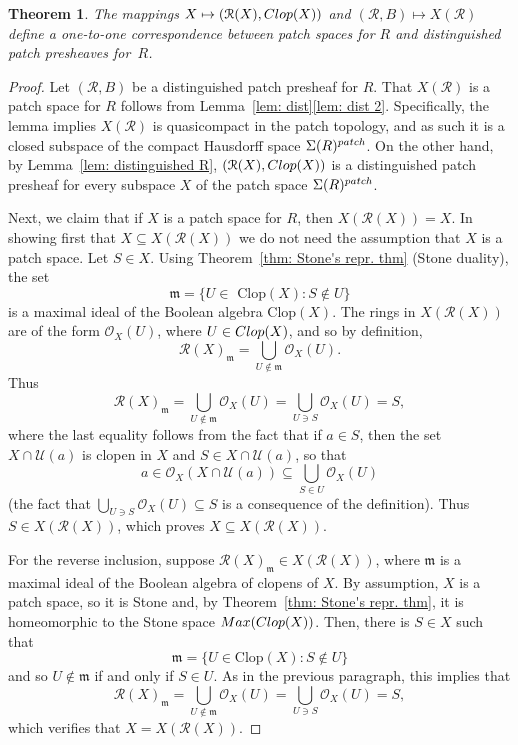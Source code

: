\documentclass[11pt]{amsart}
\def\m{{\mathfrak m}} %
\def\O{{\mathcal{O}}}
\newtheorem{theorem}{Theorem}[section]
\theoremstyle{definition}
\def\cal{\mathcal}
\begin{document}
\begin{theorem}\label{thm: one-to-one dist patch} 
The mappings $X \mapsto ({\cal R}(X), {\rm Clop}(X))$ and $({\cal R}, B)\mapsto X(\cal R)$ define a one-to-one correspondence between patch spaces for $R$ and distinguished patch presheaves for~$R$.  
\end{theorem} 

\begin{proof}  Let $({\cal R},B)$ be a distinguished patch presheaf for $R$. That $X({\cal R})$ is a patch space for $R$ follows from Lemma~\ref{lem: dist}\ref{lem: dist 2}. Specifically, the lemma implies  $X({\cal R})$ is quasicompact in the patch topology, and as such it is a closed subspace of the compact Hausdorff space $\Sigma(R)^{\rm patch}$. On the other hand, by Lemma~\ref{lem: distinguished R}, $({\cal R}(X),{\rm Clop}(X))$ is a distinguished patch presheaf for every subspace $X$ of the patch space $\Sigma(R)^{\rm patch}$. 

Next, we claim that if $X$ is a patch space for $R$, then $X({\mathcal R}(X)) = X$. 
In showing first that $X \subseteq X({\mathcal R}(X))$ we do not need the assumption that $X$ is a patch space. 
Let $S \in X$. Using Theorem~\ref{thm: Stone's repr. thm} (Stone duality), the set $$\m = \{U \in {\mbox{ Clop}}(X):S \not \in U\}$$ is a maximal ideal of the Boolean algebra Clop$(X)$.
The rings in $X({\cal R}(X))$ are of the form $\O_X(U)$, where $U \in {\rm Clop}(X)$, and so by definition, 
$${\cal R}(X)_{\m} = \bigcup_{U \not \in  \m}\O_X(U).$$ 
Thus %
$$ {\cal R}(X)_{\m} = \bigcup_{U \not \in \m}\O_X(U) = \bigcup_{U\ni S}\O_X(U) =S,$$ where the last equality follows from the fact that if $a \in S$, then the set $X \cap {\cal U}(a)$ is clopen in $X$  and $S \in X \cap {\cal U}(a)$, so that $$a \in
\O_X(X \cap {\cal U}(a)) \subseteq 
\bigcup_{S \in U}\O_X(U)$$ 
(the fact that $\bigcup_{U\ni S}\O_X(U) \subseteq S$ is a consequence of the definition). Thus $S \in X({\cal R}(X))$, which proves $X \subseteq X({\cal R}(X))$. 

For the reverse inclusion, suppose  ${\cal R}(X)_{\m} \in X({\cal R}(X))$, where $\m$ is a maximal ideal of the Boolean algebra of clopens of $X$. By assumption, $X$ is a patch space, so it is Stone and, by Theorem~\ref{thm: Stone's repr. thm}, it is homeomorphic to the Stone space ${\rm Max}({\rm Clop}(X))$. 
Then, there is $S\in X$ such that $$\m = \{U \in {\mbox{Clop}}(X):S \not \in U\}$$ and so $U\not\in \m$ if and only if $S\in U$. As in the previous paragraph, this implies that $$ {\cal R}(X)_\m=\bigcup_{U \not \in  \m}\O_X(U) = \bigcup_{U \ni S}\O_X(U)=
S,$$  which verifies that $X = X({\cal R}(X))$.
 

\end{proof}
\end{document}
